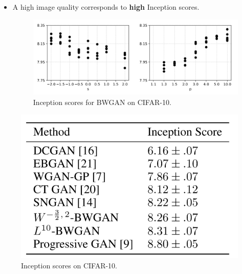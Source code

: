 \documentclass[landscape,headrule,footrule]{foils}
\begin{document}

\begin{frame}
\begin{flushleft}
\begin{itemize}
\item A high image quality corresponds to \textbf{high} Inception scores. \\
\begin{figure}
\center
\includegraphics[scale=0.8]{figure/fig3.png}
\caption{Inception scores for BWGAN on CIFAR-10.}
\end{figure}

\end{itemize}
\end{flushleft}
\end{frame}


\begin{frame}
\begin{flushleft}
\begin{itemize}
\begin{figure}
\center
\includegraphics[scale=0.8]{figure/fig4.png}
\caption{Inception scores on CIFAR-10.}
\end{figure}

\end{itemize}
\end{flushleft}
\end{frame}
\end{document}
